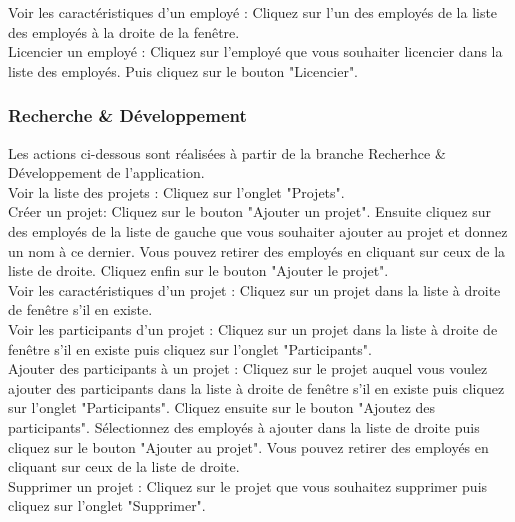 Voir les caractéristiques d'un employé : Cliquez sur l'un des employés de la liste des employés à la droite de la fenêtre.\\

Licencier un employé : Cliquez sur l'employé que vous souhaiter licencier dans la liste des employés. Puis cliquez sur le bouton "Licencier".\\



\subsubsection*{Recherche \& Développement}



Les actions ci-dessous sont réalisées à partir de la branche Recherhce \& Développement de l'application.\\

Voir la liste des projets : Cliquez sur l'onglet "Projets". \\

Créer un projet: Cliquez sur le bouton "Ajouter un projet". Ensuite cliquez sur des employés de la liste de gauche que vous souhaiter ajouter au projet et donnez un nom à ce dernier. Vous pouvez retirer des employés en cliquant sur ceux de la liste de droite. Cliquez enfin sur le bouton "Ajouter le projet". \\

Voir les caractéristiques d'un projet : Cliquez sur un projet dans la liste à droite de fenêtre s'il en existe. \\

Voir les participants d'un projet : Cliquez sur un projet dans la liste à droite de fenêtre s'il en existe puis cliquez sur l'onglet "Participants". \\

Ajouter des participants à un projet : Cliquez sur le projet auquel vous voulez ajouter des participants dans la liste à droite de fenêtre s'il en existe puis cliquez sur l'onglet "Participants". Cliquez ensuite sur le bouton "Ajoutez des participants". Sélectionnez des employés à ajouter dans la liste de droite puis cliquez sur le bouton "Ajouter au projet". Vous pouvez retirer des employés en cliquant sur ceux de la liste de droite.\\

Supprimer un projet : Cliquez sur le projet que vous souhaitez supprimer puis cliquez sur l'onglet "Supprimer". \\

